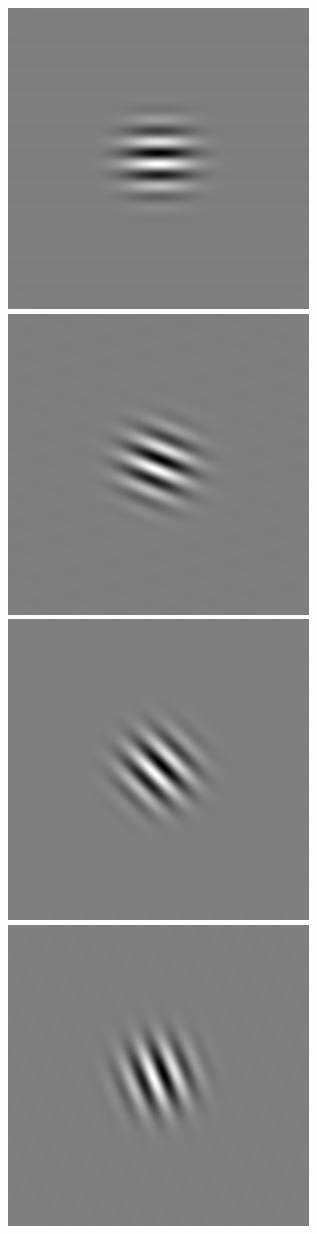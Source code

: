 \begin{figure}
\begin{center}
 \includegraphics[scale=0.1]{ch4/figures/rGabor4_4.jpg}
 \includegraphics[scale=0.1]{ch4/figures/rGabor4_5.jpg}
 \includegraphics[scale=0.1]{ch4/figures/rGabor4_6.jpg}
 \includegraphics[scale=0.1]{ch4/figures/rGabor4_7.jpg}\\

\end{center}
\end{figure}

